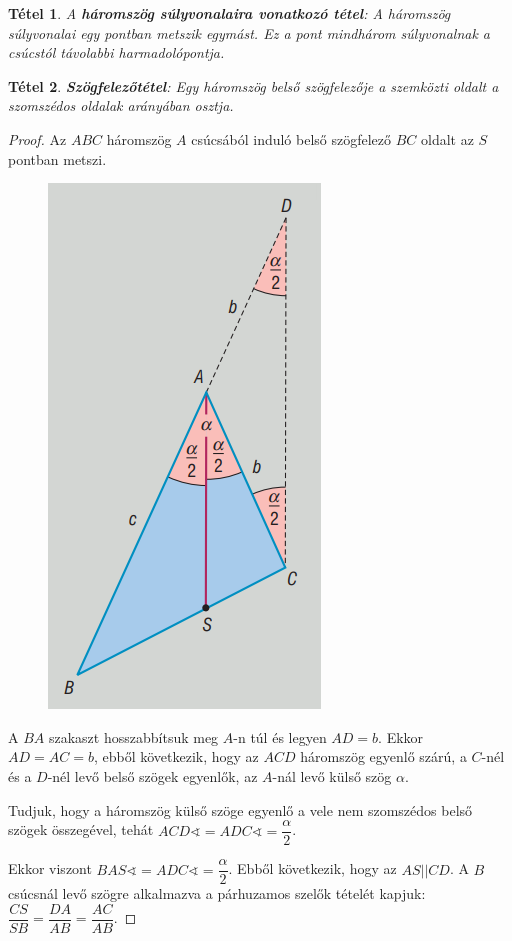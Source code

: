 \documentclass[12pt,a4paper]{article}
\newtheorem{theorem}{Tétel} [section]
\begin{document}
\begin{theorem}
A \textbf{háromszög súlyvonalaira vonatkozó tétel}: A háromszög súlyvonalai egy pontban metszik egymást. Ez a pont mindhárom súlyvonalnak a csúcstól távolabbi harmadolópontja.
\end{theorem}
\newpage
\begin{theorem}
\textbf{Szögfelezőtétel}: Egy háromszög belső szögfelezője a szemközti oldalt a szomszédos oldalak arányában osztja.
\end{theorem}
\begin{proof}
Az $ABC$ háromszög $A$ csúcsából induló belső szögfelező $BC$ oldalt az $S$ pontban metszi.
\begin{figure}[h!]
\centering
\includegraphics[scale=0.4]{geometry/szogfelezotetel}
\end{figure}

A $BA$ szakaszt hosszabbítsuk meg $A$-n túl és legyen $AD = b$. Ekkor $AD = AC = b$, ebből következik, hogy az $ACD$ háromszög egyenlő szárú, a $C$-nél és a $D$-nél levő belső szögek egyenlők, az $A$-nál levő külső szög $\alpha$.

Tudjuk, hogy a háromszög külső szöge egyenlő a vele nem szomszédos belső szögek összegével, tehát $ACD\sphericalangle=ADC\sphericalangle=\dfrac{\alpha}{2}$.

Ekkor viszont $BAS\sphericalangle=ADC\sphericalangle=\dfrac{\alpha}{2}$. Ebből következik, hogy az $AS||CD$. A $B$ csúcsnál levő szögre alkalmazva a párhuzamos szelők tételét kapjuk: $\dfrac{CS}{SB}=\dfrac{DA}{AB}=\dfrac{AC}{AB}$.
\end{proof}
\end{document}
